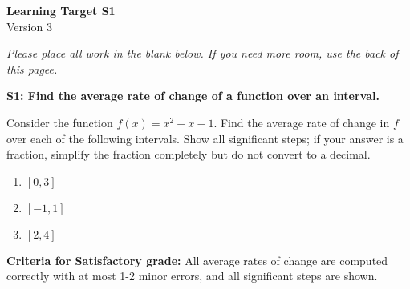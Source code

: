\documentclass[10pt]{article}
\begin{document}
	\vspace*{0in}

		\begin{center}
			\textbf{Learning Target S1} \\
			{Version 3} \\
		\end{center}

\emph{Please place all work in the blank below. If you need more room, use the back of this pagee.}

\begin{framed}
	\textbf{S1: Find the average rate of change of a function over an interval.}
\end{framed}

Consider the function $f(x) = x^2 + x - 1$. Find the average rate of change in $f$ over each of the following intervals. Show all significant steps; if your answer is a fraction, simplify the fraction completely but do not convert to a decimal. 

\begin{enumerate}
    \item $[0,3]$
    \item $[-1,1]$
    \item $[2,4]$
\end{enumerate}

\vfill


\begin{small}
    \begin{framed}
        	\textbf{Criteria for Satisfactory grade:} All average rates of change are computed correctly with at most 1-2 minor errors, and all significant steps are shown. 
    \end{framed}

\end{small}
\end{document}
